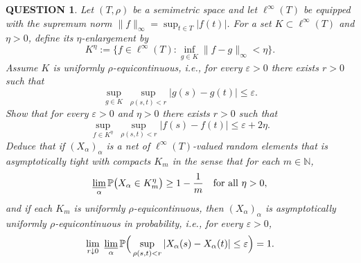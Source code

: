 \documentclass[12pt]{article}
\renewcommand{\(}{\left(}%
\renewcommand{\)}{\right)}%
\renewcommand{\[}{\left[}%
\renewcommand{\]}{\right]}%
\newtheorem{question}{QUESTION}[section]}
\begin{document}
\begin{question}
Let $(T,\rho)$ be a semimetric space and let $\ell^\infty(T)$ be equipped with the supremum norm $\|f\|_\infty=\sup_{t\in T}|f(t)|$.
For a set $K\subset\ell^\infty(T)$ and $\eta>0$, define its $\eta$-enlargement by
\begin{equation*}
K^\eta := \Big\{ f\in \ell^\infty(T): \inf_{g\in K}\|f-g\|_\infty < \eta \Big\}.
\end{equation*}
Assume $K$ is uniformly $\rho$-equicontinuous, i.e., for every $\varepsilon>0$ there exists $r>0$ such that
\begin{equation*}
\sup_{g\in K}\ \sup_{\rho(s,t)<r}|g(s)-g(t)| \le \varepsilon.
\end{equation*}
Show that for every $\varepsilon>0$ and $\eta>0$ there exists $r>0$ such that
\begin{equation*}
\sup_{f\in K^\eta}\ \sup_{\rho(s,t)<r}|f(s)-f(t)| \le \varepsilon + 2\eta.
\end{equation*}
Deduce that if $(X_\alpha)_\alpha$ is a net of $\ell^\infty(T)$-valued random elements that is asymptotically tight with compacts $K_m$ in the sense that for each $m\in\mathbb{N}$,
\begin{equation*}
\varliminf_\alpha \mathbb{P}\big(X_\alpha \in K_m^\eta\big) \ge 1-\frac{1}{m}\quad\text{for all }\eta>0,
\end{equation*}
and if each $K_m$ is uniformly $\rho$-equicontinuous, then $(X_\alpha)_\alpha$ is asymptotically uniformly $\rho$-equicontinuous in probability, i.e., for every $\varepsilon>0$,
\begin{equation*}
\lim_{r\downarrow 0}\ \varliminf_\alpha \mathbb{P}\Big(\sup_{\rho(s,t)<r}|X_\alpha(s)-X_\alpha(t)|\le \varepsilon\Big)=1.
\end{equation*}
\end{question}
\end{document}
